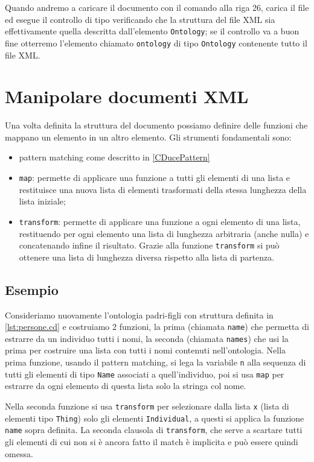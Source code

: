 Quando andremo a caricare il documento con il comando alla riga 26, \cduce carica il file ed esegue il controllo di tipo verificando che la struttura del file XML sia effettivamente quella descritta dall'elemento \verb|Ontology|; se il controllo va a buon fine otterremo l'elemento chiamato \verb|ontology| di tipo \verb|Ontology| contenente tutto il file XML.
\section{Manipolare documenti XML}
Una volta definita la struttura del documento possiamo definire delle funzioni che mappano un elemento in un altro elemento. Gli strumenti fondamentali sono:
\begin{itemize}
	\item pattern matching come descritto in \ref{CDucePattern}
	\item \verb|map|\label{map}: permette di applicare una funzione a tutti gli elementi di una lista e restituisce una nuova lista di elementi trasformati della stessa lunghezza della lista iniziale;
	\item \verb|transform|: permette di applicare una funzione a ogni elemento di una lista, restituendo per ogni elemento una lista di lunghezza arbitraria (anche nulla) e concatenando infine il risultato. Grazie alla funzione \verb|transform| si può ottenere una lista di lunghezza diversa rispetto alla lista di partenza.
\end{itemize}
\subsection{Esempio}
Consideriamo nuovamente l'ontologia padri-figli con struttura definita in \ref{lst:persone.cd} e costruiamo 2 funzioni, la prima (chiamata \verb|name|) che permetta di estrarre da un individuo tutti i nomi, la seconda (chiamata \verb|names|) che usi la prima per costruire una lista con tutti i nomi contenuti nell'ontologia.
Nella prima funzione, usando il pattern matching, si lega la variabile \verb|n| alla sequenza di tutti gli elementi di tipo \verb|Name| associati a quell'individuo, poi si usa \verb|map| per estrarre da ogni elemento di questa lista solo la stringa col nome.

Nella seconda funzione si usa \verb|transform| per selezionare dalla lista \verb|x| (lista di elementi tipo \verb|Thing|) solo gli elementi \verb|Individual|, a questi si applica la funzione \verb|name| sopra definita. La seconda clausola di \verb|transform|, che serve a scartare tutti gli elementi di cui non si è ancora fatto il match è implicita e può essere quindi omessa.

